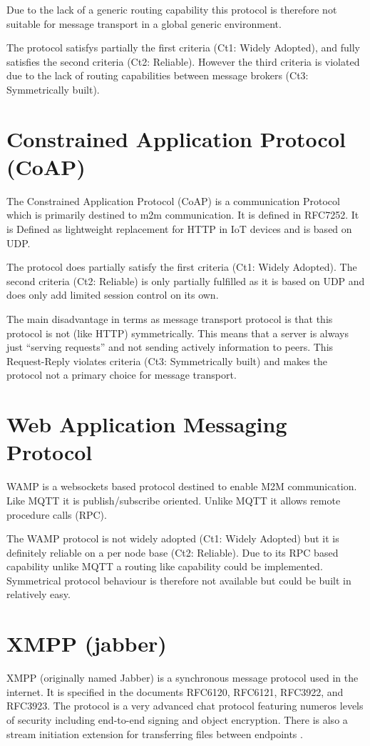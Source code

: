 \documentclass[a4paper,appendixprefix,pdfusetitle,twocolumn,fontsize=8pt,attachdocs,draft,status=draft]{scrbook}
\begin{document}
Due to the lack of a generic routing capability this protocol is therefore not suitable for message transport in a global generic environment.

The protocol satisfys partially the first criteria (Ct1: Widely Adopted), and fully satisfies the second criteria (Ct2: Reliable). However the third criteria is violated due to the lack of routing capabilities between message brokers (Ct3: Symmetrically built).

\section{Constrained Application Protocol (CoAP)}
The Constrained Application Protocol (CoAP) is a communication Protocol which is primarily destined to m2m communication. It is defined in RFC7252\cite{RFC7252}.  It is Defined as lightweight replacement for HTTP in IoT devices and is based on UDP.

The protocol does partially satisfy the first criteria (Ct1: Widely Adopted). The second criteria (Ct2: Reliable) is only partially fulfilled as it is based on UDP and does only add limited session control on its own.

The main disadvantage in terms as message transport protocol is that this protocol is not (like HTTP) symmetrically. This means that a server is always just ``serving requests'' and not sending actively information to peers. This Request-Reply violates criteria (Ct3: Symmetrically built) and makes the protocol not a primary choice for  message transport. 

\section{Web Application Messaging Protocol}
WAMP is a websockets based protocol destined to enable M2M communication. Like MQTT it is publish/subscribe oriented. Unlike MQTT it allows remote procedure calls (RPC).

The WAMP protocol is not widely adopted (Ct1: Widely Adopted) but it is definitely reliable on a per node base (Ct2: Reliable). Due to its RPC based capability unlike MQTT a routing like capability could be implemented. Symmetrical protocol behaviour is therefore not available but could be built in relatively easy.

\section{XMPP (jabber)}
XMPP (originally named Jabber) is a synchronous message protocol used in the internet. It is specified in the documents RFC6120\cite{RFC6120}, RFC6121\cite{RFC6120}, RFC3922\cite{RFC3922}, and RFC3923\cite{RFC3923}. The protocol is a very advanced chat protocol featuring numeros levels of security including end-to-end signing and object encryption\cite{RFC3923}. There is also a stream initiation extension for transferring files between endpoints \cite{xep0096}.
\end{document}
